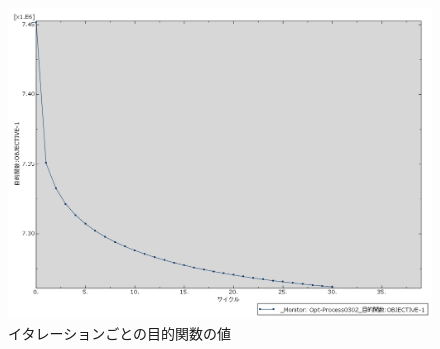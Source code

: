 \documentclass[11pt]{jsarticle}
\begin{document}
		\begin{figure}[!h]
			\centering
			\includegraphics[width=0.6\columnwidth]{Figure/test2.png}
			\caption{イタレーションごとの目的関数の値}
			\label{fig:Graph}
		\end{figure}
	
	
	\newpage
\vspace{10cm}

\vspace{14cm}
	\articleSPRfour
	\articleSPRfive
\end{document}
